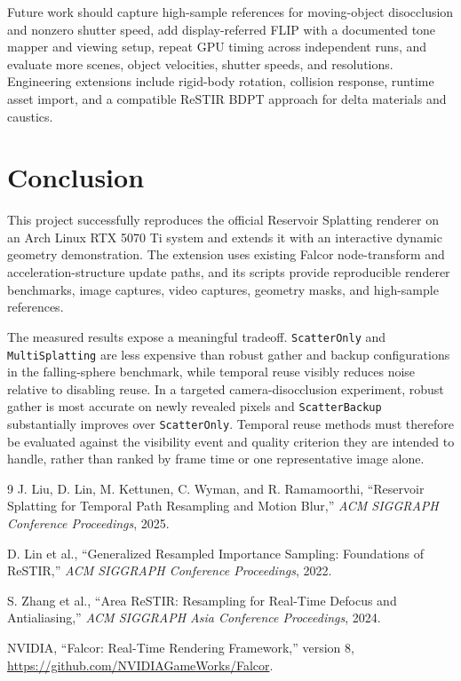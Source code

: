 \documentclass[10pt,twocolumn]{article}
\newcommand{\method}[1]{\texttt{#1}}
\begin{document}
Future work should capture high-sample references for moving-object
disocclusion and nonzero shutter speed, add display-referred FLIP with a
documented tone mapper and viewing setup, repeat GPU timing across independent
runs, and evaluate more scenes, object velocities, shutter speeds, and
resolutions. Engineering extensions include rigid-body rotation, collision
response, runtime asset import, and a compatible ReSTIR BDPT approach for
delta materials and caustics.

\section{Conclusion}

This project successfully reproduces the official Reservoir Splatting renderer
on an Arch Linux RTX 5070 Ti system and extends it with an interactive dynamic
geometry demonstration. The extension uses existing Falcor node-transform and
acceleration-structure update paths, and its scripts provide reproducible
renderer benchmarks, image captures, video captures, geometry masks, and
high-sample references.

The measured results expose a meaningful tradeoff. \method{ScatterOnly} and
\method{MultiSplatting} are less expensive than robust gather and backup
configurations in the falling-sphere benchmark, while temporal reuse visibly
reduces noise relative to disabling reuse. In a targeted camera-disocclusion
experiment, robust gather is most accurate on newly revealed pixels and
\method{ScatterBackup} substantially improves over \method{ScatterOnly}.
Temporal reuse methods must therefore be evaluated against the visibility
event and quality criterion they are intended to handle, rather than ranked by
frame time or one representative image alone.

\begin{thebibliography}{9}
J. Liu, D. Lin, M. Kettunen, C. Wyman, and R. Ramamoorthi,
``Reservoir Splatting for Temporal Path Resampling and Motion Blur,''
\emph{ACM SIGGRAPH Conference Proceedings}, 2025.

D. Lin et al.,
``Generalized Resampled Importance Sampling: Foundations of ReSTIR,''
\emph{ACM SIGGRAPH Conference Proceedings}, 2022.

S. Zhang et al.,
``Area ReSTIR: Resampling for Real-Time Defocus and Antialiasing,''
\emph{ACM SIGGRAPH Asia Conference Proceedings}, 2024.

NVIDIA,
``Falcor: Real-Time Rendering Framework,'' version 8,
\url{https://github.com/NVIDIAGameWorks/Falcor}.
\end{thebibliography}
\end{document}
